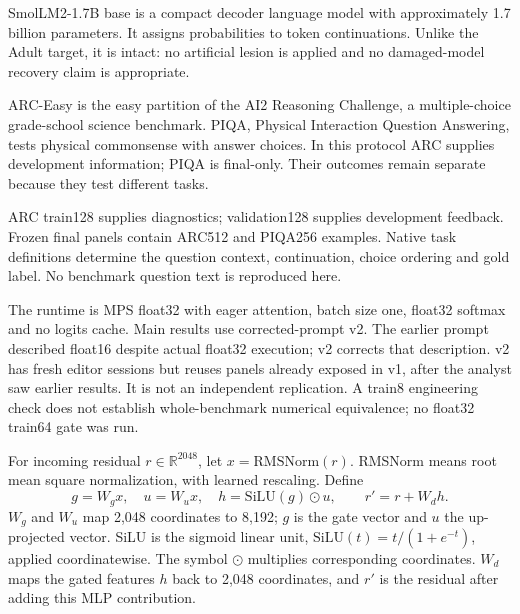 SmolLM2-1.7B base is a compact decoder language model with approximately 1.7 billion parameters. It assigns probabilities to token continuations. Unlike the Adult target, it is intact: no artificial lesion is applied and no damaged-model recovery claim is appropriate.

ARC-Easy is the easy partition of the AI2 Reasoning Challenge, a multiple-choice grade-school science benchmark. PIQA, Physical Interaction Question Answering, tests physical commonsense with answer choices. In this protocol ARC supplies development information; PIQA is final-only. Their outcomes remain separate because they test different tasks.


ARC train128 supplies diagnostics; validation128 supplies development feedback. Frozen final panels contain ARC512 and PIQA256 examples. Native task definitions determine the question context, continuation, choice ordering and gold label. No benchmark question text is reproduced here.

The runtime is MPS float32 with eager attention, batch size one, float32 softmax and no logits cache. Main results use corrected-prompt v2. The earlier prompt described float16 despite actual float32 execution; v2 corrects that description. v2 has fresh editor sessions but reuses panels already exposed in v1, after the analyst saw earlier results. It is not an independent replication. A train8 engineering check does not establish whole-benchmark numerical equivalence; no float32 train64 gate was run.


For incoming residual $r\in\mathbb R^{2048}$, let $x=\mathrm{RMSNorm}(r)$. RMSNorm means root mean square normalization, with learned rescaling. Define
\[
g=W_gx,\quad u=W_ux,\quad h=\mathrm{SiLU}(g)\odot u,
\qquad r'=r+W_dh.
\]
$W_g$ and $W_u$ map 2,048 coordinates to 8,192; $g$ is the gate vector and $u$ the up-projected vector. SiLU is the sigmoid linear unit, $\mathrm{SiLU}(t)=t/(1+e^{-t})$, applied coordinatewise. The symbol $\odot$ multiplies corresponding coordinates. $W_d$ maps the gated features $h$ back to 2,048 coordinates, and $r'$ is the residual after adding this MLP contribution.

